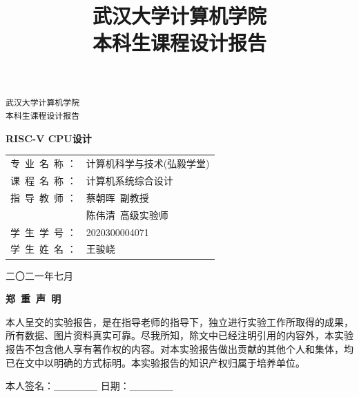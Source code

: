 \documentclass[UTF8,a4paper,autofakebold,15pt]{ctexart}
\title{武汉大学计算机学院\\
	本科生课程设计报告
}
\author{}
\date{}
\begin{document}
	
	\begin{center}
		
	\vspace{50pt}
	{\tt 武汉大学计算机学院\\\vspace{10pt}
		本科生课程设计报告}
	
	\vspace{50pt}
	
	{\heiti{}\bf RISC-V CPU设计}
	
	\vspace{100pt}
	
	\begin{spacing}{1.5}
	\qquad\begin{tabular}{ll}
		专\ 业\ 名\ 称   ：&计算机科学与技术(弘毅学堂)\\
		
		课\ 程\ 名\ 称   ：&计算机系统综合设计\\
		
		指\ 导\ 教\ 师   ：&蔡朝晖\ 副教授\\
		&陈伟清\ 高级实验师\\
		
		学\ 生\ 学\ 号   ：&2020300004071\\
		
		学\ 生\ 姓\ 名   ：&王骏峣
	\end{tabular}

	\end{spacing}

	\vspace{100pt}

	 二〇二一年七月
	
	\end{center}
	

\newpage

	\begin{center}
	{\setmainfont{SimSun}\bf 郑\ 重\ 声\ 明}
	\end{center}

	\vspace{20pt}
	
	本人呈交的实验报告，是在指导老师的指导下，独立进行实验工作所取得的成果，所有数据、图片资料真实可靠。尽我所知，除文中已经注明引用的内容外，本实验报告不包含他人享有著作权的内容。对本实验报告做出贡献的其他个人和集体，均已在文中以明确的方式标明。本实验报告的知识产权归属于培养单位。
	
	\vspace{20pt}
	
	本人签名：\_\_\_\_\_\_          日期：\_\_\_\_\_\_
	
\end{document}
